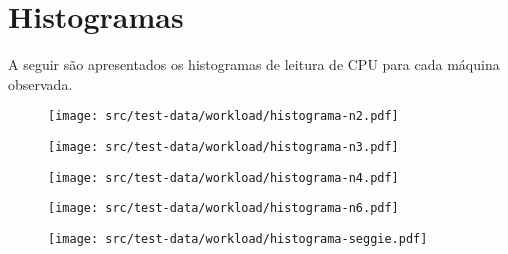 \apendice

\chapter{Histogramas}

A seguir são apresentados os histogramas de leitura de CPU para cada
máquina observada.

\begin{figure}[htp]
\centering
\texttt{[image: src/test-data/workload/histograma-n2.pdf]}
\label{fig:histn2}
\end{figure}

\begin{figure}[htp]
\centering
\texttt{[image: src/test-data/workload/histograma-n3.pdf]}
\label{fig:histn3}
\end{figure}

\begin{figure}[htp]
\centering
\texttt{[image: src/test-data/workload/histograma-n4.pdf]}
\label{fig:histn4}
\end{figure}

\begin{figure}[htp]
\centering
\texttt{[image: src/test-data/workload/histograma-n6.pdf]}
\label{fig:histn6}
\end{figure}

\begin{figure}[htp]
\centering
\texttt{[image: src/test-data/workload/histograma-seggie.pdf]}
\label{fig:histseggie}
\end{figure}
